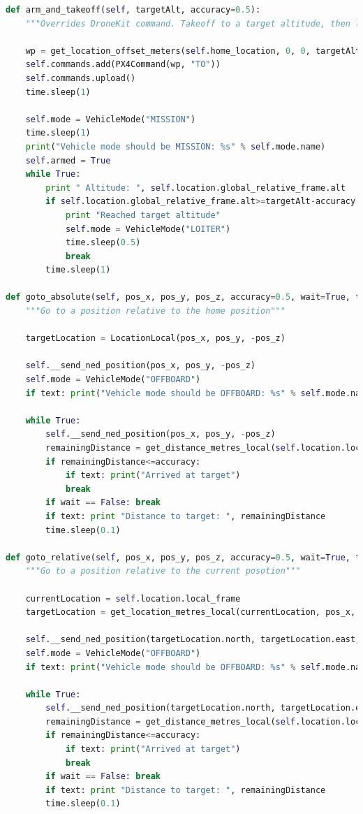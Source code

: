 \documentclass[11pt,twoside]{article}
\begin{document}
\begin{lstlisting}[language=Python]
def arm_and_takeoff(self, targetAlt, accuracy=0.5):
    """Overrides DroneKit command. Takeoff to a target altitude, then loiter."""

    wp = get_location_offset_meters(self.home_location, 0, 0, targetAlt)
    self.commands.add(PX4Command(wp, "TO"))
    self.commands.upload()
    time.sleep(1)

    self.mode = VehicleMode("MISSION")
    time.sleep(1)
    print("Vehicle mode should be MISSION: %s" % self.mode.name)
    self.armed = True
    while True:
        print " Altitude: ", self.location.global_relative_frame.alt
        if self.location.global_relative_frame.alt>=targetAlt-accuracy:
            print "Reached target altitude"
            self.mode = VehicleMode("LOITER")
            time.sleep(0.5)
            break
        time.sleep(1)

def goto_absolute(self, pos_x, pos_y, pos_z, accuracy=0.5, wait=True, text=True):
    """Go to a position relative to the home position"""

    targetLocation = LocationLocal(pos_x, pos_y, -pos_z)

    self.__send_ned_position(pos_x, pos_y, -pos_z)
    self.mode = VehicleMode("OFFBOARD")
    if text: print("Vehicle mode should be OFFBOARD: %s" % self.mode.name)

    while True:
        self.__send_ned_position(pos_x, pos_y, -pos_z)
        remainingDistance = get_distance_metres_local(self.location.local_frame, targetLocation)
        if remainingDistance<=accuracy:
            if text: print("Arrived at target")
            break
        if wait == False: break
        if text: print "Distance to target: ", remainingDistance
        time.sleep(0.1)

def goto_relative(self, pos_x, pos_y, pos_z, accuracy=0.5, wait=True, text=True):
    """Go to a position relative to the current posotion"""

    currentLocation = self.location.local_frame
    targetLocation = get_location_metres_local(currentLocation, pos_x, pos_y, -pos_z)\

    self.__send_ned_position(targetLocation.north, targetLocation.east, targetLocation.down)
    self.mode = VehicleMode("OFFBOARD")
    if text: print("Vehicle mode should be OFFBOARD: %s" % self.mode.name)

    while True:
        self.__send_ned_position(targetLocation.north, targetLocation.east, targetLocation.down)
        remainingDistance = get_distance_metres_local(self.location.local_frame, targetLocation)
        if remainingDistance<=accuracy:
            if text: print("Arrived at target")
            break
        if wait == False: break
        if text: print "Distance to target: ", remainingDistance
        time.sleep(0.1)


\end{lstlisting}
\end{document}
